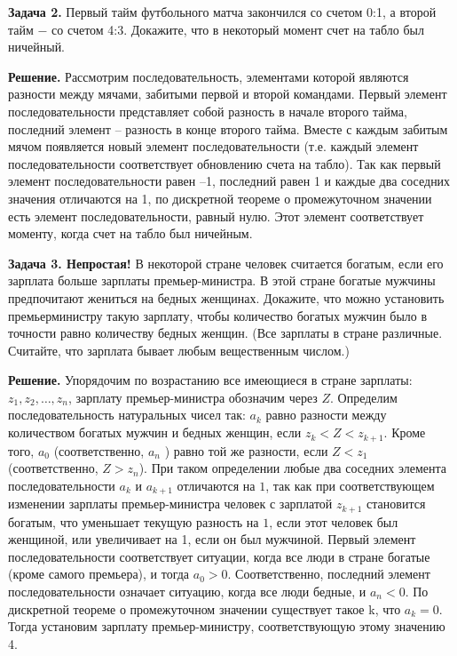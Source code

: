 \textbf{Задача 2.} Первый тайм футбольного матча закончился со счетом 0:1, а второй тайм $-$ со счетом 4:3. Докажите, что в некоторый момент счет на табло был ничейный.

\textbf{Решение.} Рассмотрим последовательность, элементами которой являются разности между мячами, забитыми первой и второй командами. Первый элемент последовательности представляет собой разность в начале второго тайма, последний элемент – разность в конце второго тайма. Вместе с каждым забитым мячом появляется новый элемент последовательности (т.е. каждый элемент последовательности соответствует обновлению счета на табло). Так как первый элемент последовательности равен –1, последний равен 1 и каждые два соседних значения отличаются на 1, по дискретной теореме о промежуточном значении есть элемент последовательности, равный нулю. Этот элемент соответствует моменту, когда счет на табло был ничейным.

\textbf{Задача 3. Непростая!} В некоторой стране человек считается богатым, если его зарплата больше зарплаты премьер-министра. В этой стране богатые мужчины предпочитают жениться на бедных женщинах. Докажите, что можно установить премьерминистру такую зарплату, чтобы количество богатых мужчин было в точности равно количеству бедных женщин. (Все зарплаты в стране различные. Считайте, что зарплата бывает любым вещественным числом.)

\textbf{Решение.} Упорядочим по возрастанию все имеющиеся в стране зарплаты: $z_1, z_2, \dotsc, z_n$, зарплату премьер-министра обозначим через $Z$. Определим последовательность натуральных чисел так: $a_k$ равно разности между количеством богатых мужчин и бедных женщин, если $z_k < Z < z_{k+1}$. Кроме того, $a_0$ (соответственно, $a_n$ ) равно той же разности, если $Z < z_1$ (соответственно, $Z > z_n$). При таком определении любые два соседних элемента последовательности $a_k$ и $a_{k + 1}$ отличаются на $1$, так как при соответствующем изменении зарплаты премьер-министра человек с зарплатой $z_{k+1}$ становится богатым, что уменьшает текущую разность на $1$, если этот человек был женщиной, или увеличивает на 1, если он был мужчиной. Первый элемент последовательности соответствует ситуации, когда все люди в стране богатые (кроме самого премьера), и тогда $a_0 > 0$. Соответственно, последний элемент последовательности означает ситуацию, когда все люди бедные, и $a_n < 0$. По дискретной теореме о промежуточном значении существует такое k, что $a_k = 0$. Тогда установим зарплату премьер-министру, соответствующую этому значению 4.

